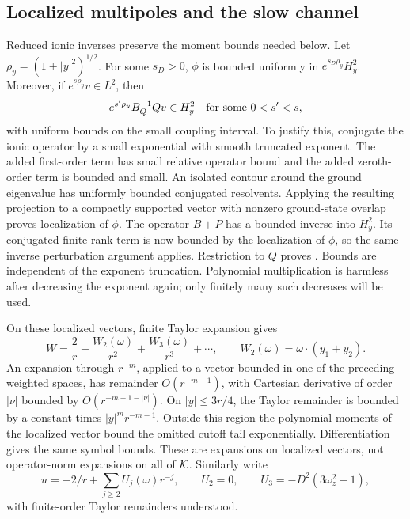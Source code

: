 \subsection{Localized multipoles and the slow channel}

Reduced ionic inverses preserve the moment bounds needed below.
Let \(\rho_y=(1+|y|^2)^{1/2}\).  For some \(s_D>0\),
\(\phi\) is bounded uniformly in \(e^{s_D\rho_y}H^2_y\).
Moreover, if \(e^{s\rho_y}v\in L^2\), then
\begin{equation}
 e^{s'\rho_y}B_Q^{-1}Qv\in H^2_y
 \quad\hbox{for some }0<s'<s,
 \label{eq:weighted-ionic-inverse}
\end{equation}
with uniform bounds on the small coupling interval.
To justify this, conjugate the ionic operator by a small exponential
with smooth truncated exponent.  The added first-order term has
small relative operator bound and the added zeroth-order term is
bounded and small.  An isolated contour around the ground
eigenvalue has uniformly bounded conjugated resolvents.  Applying
the resulting projection to a compactly supported vector with
nonzero ground-state overlap proves localization of \(\phi\).
The operator \(B+P\) has a bounded inverse into \(H^2_y\).
Its conjugated finite-rank term is now bounded by the localization
of \(\phi\), so the same inverse perturbation argument applies.
Restriction to \(Q\) proves .
Bounds are independent of the exponent truncation.  Polynomial
multiplication is harmless after decreasing the exponent again;
only finitely many such decreases will be used.

On these localized vectors, finite Taylor expansion gives
\begin{equation}
 W=\frac2r+\frac{W_2(\omega)}{r^2}
       +\frac{W_3(\omega)}{r^3}+\cdots,\qquad
 W_2(\omega)=\omega\cdot(y_1+y_2).
 \label{eq:ionic-multipoles}
\end{equation}
An expansion through \(r^{-m}\), applied to a vector bounded in
one of the preceding weighted spaces, has remainder \(O(r^{-m-1})\),
with Cartesian derivative of order \(|\nu|\) bounded by
\(O(r^{-m-1-|\nu|})\).
On \(|y|\leq3r/4\), the Taylor remainder is bounded by a constant
times \(|y|^m r^{-m-1}\).  Outside this region the polynomial
moments of the localized vector bound the omitted cutoff tail
exponentially.  Differentiation gives the same symbol bounds.
These are expansions on localized vectors, not operator-norm
expansions on all of \(\mathcal K\).  Similarly write
\[
 u=-2/r+\sum_{j\geq2}U_j(\omega)r^{-j},\qquad
 U_2=0,\qquad U_3=-D^2(3\omega_z^2-1),
 \]
with finite-order Taylor remainders understood.

